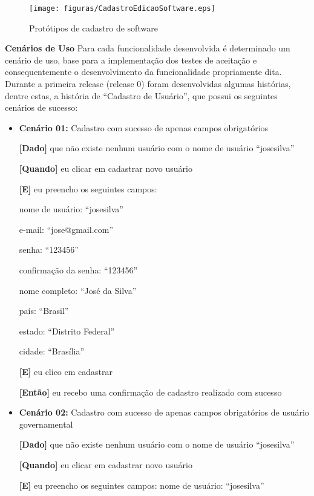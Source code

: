 	\begin{figure}[h!]
    	\centering
    	\texttt{[image: figuras/CadastroEdicaoSoftware.eps]}
    	\caption{Protótipos de cadastro de software}
    	\label{cadastro_software}
	\end{figure}

\newpage

\textbf{Cenários de Uso}
	Para cada funcionalidade desenvolvida é determinado um cenário de uso, base para a implementação dos testes de aceitação e consequentemente o desenvolvimento da funcionalidade propriamente dita.
	Durante a primeira release (release 0) foram desenvolvidas algumas histórias, dentre estas, a história de ``Cadastro de Usuário'', que possui os seguintes cenários de sucesso:

	\begin{itemize}
	\item\textbf{Cenário 01:} Cadastro com sucesso de apenas campos obrigatórios

	\textbf{[Dado]} que não existe nenhum usuário com o nome de usuário ``josesilva''

	\textbf{[Quando]} eu clicar em cadastrar novo usuário

	\textbf{[E]} eu preencho os seguintes campos: 

  		\subitem nome de usuário: ``josesilva''

  		\subitem e-mail: ``jose@gmail.com''

  		\subitem senha: ``123456''

  		\subitem confirmação da senha: ``123456''

  		\subitem nome completo: ``José da Silva''

  		\subitem país: ``Brasil''

  		\subitem estado: ``Distrito Federal''

  		\subitem cidade: ``Brasília''

	\textbf{[E]} eu clico em cadastrar

	\textbf{[Então]} eu recebo uma confirmação de cadastro realizado com sucesso


	\item\textbf{Cenário 02:} Cadastro com sucesso de apenas campos obrigatórios de usuário governamental
	
	\textbf{[Dado]} que não existe nenhum usuário com o nome de usuário ``josesilva''
	
	\textbf{[Quando]} eu clicar em cadastrar novo usuário
	
	\textbf{[E]} eu preencho os seguintes campos: 
  		\subitem nome de usuário: ``josesilva''


\end{itemize}

